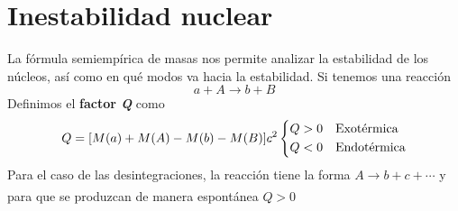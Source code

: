 \section{Inestabilidad nuclear}
La fórmula semiempírica de masas nos permite analizar la estabilidad de los núcleos, así como en qué modos va hacia la estabilidad. Si tenemos una reacción $$a+A\longrightarrow b+B$$
Definimos el \textbf{factor \textit{Q}} como 
\begin{equation}
    Q=\qty[M(a)+M(A)-M(b)-M(B)]c^2 \left \{ \begin{aligned}
        &Q>0 \quad \text{Exotérmica}\\
        &Q<0 \quad \text{Endotérmica}
    \end{aligned} \right.
    \label{eq: factor Q}
\end{equation}
Para el caso de las desintegraciones, la reacción tiene la forma $A\xrightarrow[]{} b+c+\cdots$ y para que se produzcan de manera espontánea $Q>0$

